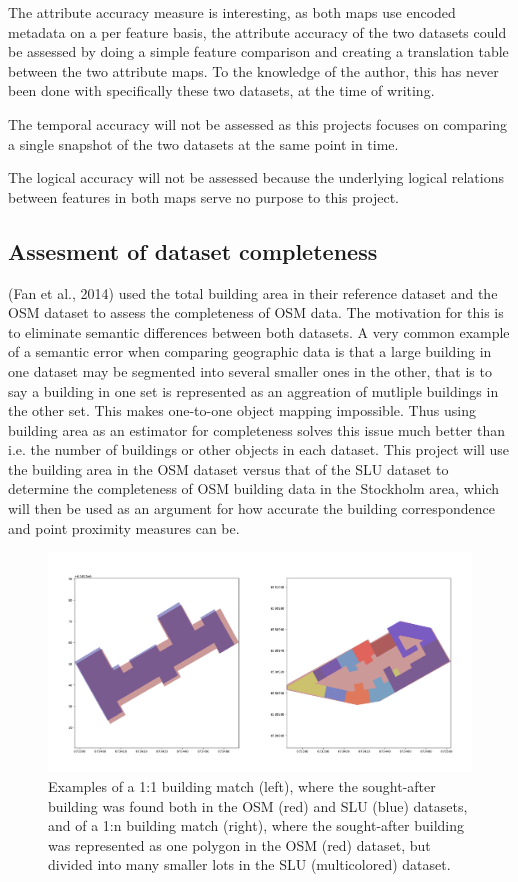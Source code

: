 \documentclass[a4paper]{article}
\begin{document}
The attribute accuracy measure is interesting, as both maps use encoded metadata on a per feature basis, the attribute accuracy of the two datasets could be assessed by doing a simple feature comparison and creating a translation table between the two attribute maps. To the knowledge of the author, this has never been done with specifically these two datasets, at the time of writing.

The temporal accuracy will not be assessed as this projects focuses on comparing a single snapshot of the two datasets at the same point in time.

The logical accuracy will not be assessed because the underlying logical relations between features in both maps serve no purpose to this project.

\subsection{Assesment of dataset completeness}

(Fan et al., 2014) used the total building area in their reference dataset and the OSM dataset to assess the completeness of OSM data. The motivation for this is to eliminate semantic differences between both datasets. A very common example of a semantic error when comparing geographic data is that a large building in one dataset may be segmented into several smaller ones in the other, that is to say a building in one set is represented as an aggreation of mutliple buildings in the other set. This makes one-to-one object mapping impossible. Thus using building area as an estimator for completeness solves this issue much better than i.e. the number of buildings or other objects in each dataset.
This project will use the building area in the OSM dataset versus that of the SLU dataset to determine the completeness of OSM building data in the Stockholm area, which will then be used as an argument for how accurate the building correspondence and point proximity measures can be.

\begin{figure}[H]
    \centering
    \includegraphics[width=\textwidth,height=0.5\textheight,keepaspectratio]{img_building_match}
    \caption{Examples of a 1:1 building match (left), where the sought-after building was found both in the OSM (red) and SLU (blue) datasets, and of a 1:n building match (right), where the sought-after building was represented as one polygon in the OSM (red) dataset, but divided into many smaller lots in the SLU (multicolored) dataset.}
    \label{fig:space}
\end{figure}
\end{document}
